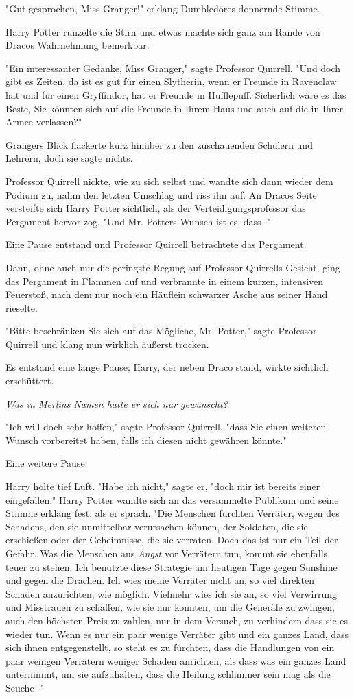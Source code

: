 {"Gut gesprochen, Miss Granger!" erklang Dumbledores donnernde Stimme.

Harry Potter runzelte die Stirn und etwas machte sich ganz am Rande von Dracos Wahrnehmung bemerkbar.

"Ein interessanter Gedanke, Miss Granger," sagte Professor Quirrell. "Und doch gibt es Zeiten, da ist es gut für einen Slytherin, wenn er Freunde in Ravenclaw hat und für einen Gryffindor, hat er Freunde in Hufflepuff. Sicherlich wäre es das Beste, Sie könnten sich auf die Freunde in Ihrem Haus und auch auf die in Ihrer Armee verlassen?"

Grangers Blick flackerte kurz hinüber zu den zuschauenden Schülern und Lehrern, doch sie sagte nichts.

Professor Quirrell nickte, wie zu sich selbst und wandte sich dann wieder dem Podium zu, nahm den letzten Umschlag und riss ihn auf. An Dracos Seite versteifte sich Harry Potter sichtlich, als der Verteidigungsprofessor das Pergament hervor zog. "Und Mr. Potters Wunsch ist es, dass -"

Eine Pause entstand und Professor Quirrell betrachtete das Pergament.

Dann, ohne auch nur die geringste Regung auf Professor Quirrells Gesicht, ging das Pergament in Flammen auf und verbrannte in einem kurzen, intensiven Feuerstoß, nach dem nur noch ein Häuflein schwarzer Asche aus seiner Hand rieselte.

"Bitte beschränken Sie sich auf das Mögliche, Mr. Potter," sagte Professor Quirrell und klang nun wirklich äußerst trocken.

Es entstand eine lange Pause; Harry, der neben Draco stand, wirkte sichtlich erschüttert.

\emph{Was in Merlins Namen hatte er sich nur gewünscht?}

"Ich will doch sehr hoffen," sagte Professor Quirrell, "dass Sie einen weiteren Wunsch vorbereitet haben, falls ich diesen nicht gewähren könnte."

Eine weitere Pause.

Harry holte tief Luft. "Habe ich nicht," sagte er, "doch mir ist bereits einer eingefallen." Harry Potter wandte sich an das versammelte Publikum und seine Stimme erklang fest, als er sprach. "Die Menschen fürchten Verräter, wegen des Schadens, den sie unmittelbar verursachen können, der Soldaten, die sie erschießen oder der Geheimnisse, die sie verraten. Doch das ist nur ein Teil der Gefahr. Was die Menschen aus \emph{Angst} vor Verrätern tun, kommt sie ebenfalls teuer zu stehen. Ich benutzte diese Strategie am heutigen Tage gegen Sunshine und gegen die Drachen. Ich wies meine Verräter nicht an, so viel direkten Schaden anzurichten, wie möglich. Vielmehr wies ich sie an, so viel Verwirrung und Misstrauen zu schaffen, wie sie nur konnten, um die Generäle zu zwingen, auch den höchsten Preis zu zahlen, nur in dem Versuch, zu verhindern dass sie es wieder tun. Wenn es nur ein paar wenige Verräter gibt und ein ganzes Land, dass sich ihnen entgegenstellt, so steht es zu fürchten, dass die Handlungen von ein paar wenigen Verrätern weniger Schaden anrichten, als dass was ein ganzes Land unternimmt, um sie aufzuhalten, dass die Heilung schlimmer sein mag als die Seuche -"

}
